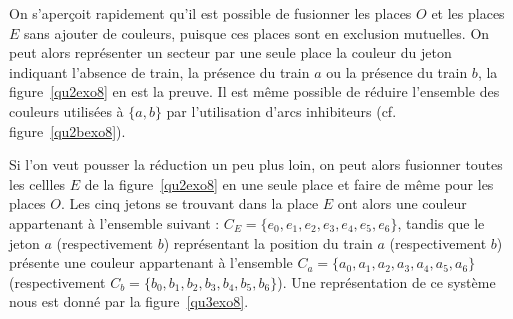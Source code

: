 On s'aperçoit rapidement qu'il est possible de fusionner les places $O$ et les places $E$ sans
ajouter de couleurs, puisque ces places sont en exclusion mutuelles. On peut alors représenter un
secteur par une seule place la couleur du jeton indiquant l'absence de train, la présence du train
$a$ ou la présence du train $b$, la figure~\ref{qu2exo8} en est la preuve. Il est même possible de
réduire l'ensemble des couleurs utilisées à $\{a, b\}$ par l'utilisation d'arcs inhibiteurs (cf.
figure~\ref{qu2bexo8}).

Si l'on veut pousser la réduction un peu plus loin, on peut alors fusionner toutes les cellles $E$
de la figure~\ref{qu2exo8} en une seule place et faire de même pour les places $O$. Les cinq jetons
se trouvant dans la place $E$ ont alors une couleur appartenant à l'ensemble suivant : $C_E = \{e_0,
e_1, e_2, e_3, e_4, e_5, e_6\}$, tandis que le jeton $a$ (respectivement $b$) représentant la
position du train $a$ (respectivement $b$) présente une couleur appartenant à l'ensemble $C_a =
\{a_0, a_1, a_2, a_3, a_4, a_5, a_6\}$ (respectivement $C_b = \{b_0, b_1, b_2, b_3, b_4, b_5,
b_6\}$). Une représentation de ce système nous est donné par la figure~\ref{qu3exo8}.

